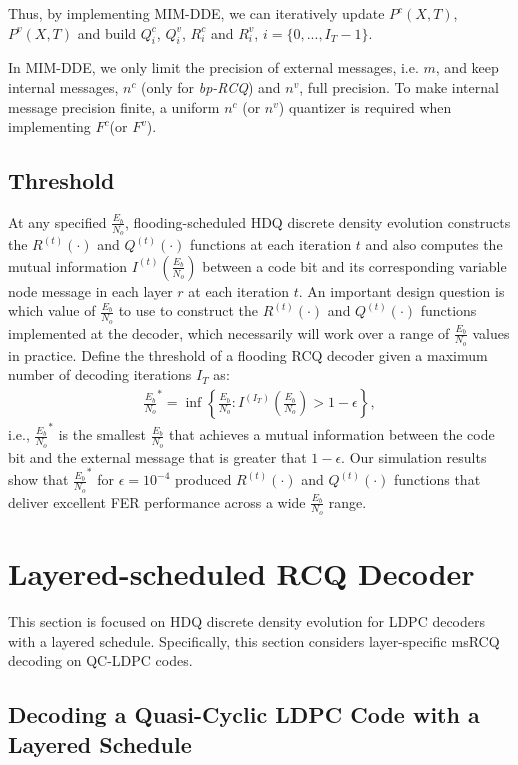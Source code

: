 \documentclass [PhD] {uclathes}
\begin{document}
Thus, by implementing MIM-DDE, we can iteratively update $P^c(X,T)$, $P^v(X,T)$ and build $Q^c_i$, $Q^v_i$, $R^c_i$ and $R^v_i$, $i=\{0,...,I_T-1\}$. 

In MIM-DDE, we only limit the precision of external messages, i.e. $m$, and keep internal messages, $n^c$ (only for \textit{bp-RCQ}) and $n^v$, full precision. To make internal message precision finite, a uniform $n^c$ (or $n^v$) quantizer is required when implementing ${F}^c$(or ${F}^v$).

\subsection{Threshold}
At any specified $\frac{E_b}{N_o}$, flooding-scheduled HDQ discrete density evolution constructs the $R^{(t)}(\cdot)$ and $Q^{(t)}(\cdot)$ functions  at each iteration $t$ and also computes the mutual information $I^{(t)}\left(\frac{E_b}{N_o}\right)$ between a code bit and its corresponding variable node message in each layer $r$ at each iteration $t$. An important design question is which value of $\frac{E_b}{N_o}$ to use to construct the $R^{(t)}(\cdot)$ and $Q^{(t)}(\cdot)$ functions implemented at the decoder, which necessarily will work over a range of $\frac{E_b}{N_o}$ values in practice.  Define the threshold of a flooding RCQ decoder given a maximum number of decoding iterations $I_T$ as: 
\begin{align}
    \frac{E_b}{N_o}^*=\inf \left\{\frac{E_b}{N_o}:  I^{(I_T)}\left(\frac{E_b}{N_o}\right)> 1-\epsilon\right\},
\end{align}
i.e., $\frac{E_b}{N_o}^*$ is the smallest $\frac{E_b}{N_o}$ that achieves a mutual information between the  code bit and the external message that is greater that $1-\epsilon$. Our simulation results show that  $\frac{E_b}{N_o}^*$ for $\epsilon = 10^{-4}$ produced $R^{(t)}(\cdot)$ and $Q^{(t)}(\cdot)$ functions that deliver excellent FER performance across a wide $\frac{E_b}{N_o}$ range. 

\section{Layered-scheduled RCQ Decoder}\label{sec: layered}

 This section is focused on HDQ discrete density evolution for LDPC decoders with a  layered schedule. Specifically, this section considers layer-specific msRCQ decoding on QC-LDPC codes.


\subsection{Decoding a Quasi-Cyclic LDPC Code with a Layered Schedule}\label{sec: QC_layer}
\end{document}
